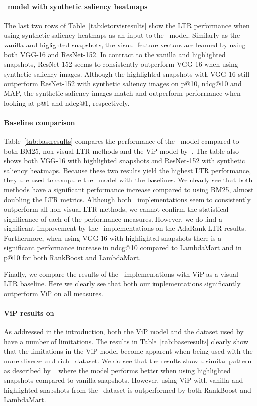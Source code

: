 \paragraph{\modelname~model with synthetic saliency heatmaps}
The last two rows of Table~\ref{tab:letorvisresults} show the \ac{LTR} performance when using synthetic saliency heatmaps as an input to the \modelname~model. Similarly as the vanilla and higlighted snapshots, the visual feature vectors are learned by using both VGG-16 and ResNet-152. In contract to the vanilla and highlighted snapshots, ResNet-152 seems to consistently outperform VGG-16 when using synthetic saliency images. Although the highlighted snapshots with VGG-16 still outperform ResNet-152 with synthetic saliency images on p@10, ndcg@10 and MAP, the synthetic saliency images match and outperform performance when looking at p@1 and ndcg@1, respectively. 

\paragraph{Baseline comparison}
Table~\ref{tab:baseresults} compares the performance of the \modelname~model compared to both BM25, non-visual \ac{LTR} methods and the ViP model by~\citet{fan2017learning}. 
The table also shows both VGG-16 with highlighted snapshots and ResNet-152 with synthetic saliency heatmaps. Because these two results yield the highest \ac{LTR} performance, they are used to compare the \modelname~model with the baselines. 
We clearly see that both methods have a significant performance increase compared to using BM25, almost doubling the \ac{LTR} metrics.
Although both \modelname~implementations seem to consistently outperform all non-visual \ac{LTR} methods, we cannot confirm the statistical significance of each of the performance measures. 
However, we do find a significant improvement by the \modelname~implementations on the AdaRank \ac{LTR} results. Furthermore, when using VGG-16 with highlighted snapshots there is a significant performance increase in ndcg@10 compared to LambdaMart and in p@10 for both RankBoost and LambdaMart.

Finally, we compare the results of the \modelname~implementations with ViP as a visual \ac{LTR} baseline. 
Here we clearly see that both our implementations significantly outperform ViP on all measures. 

\paragraph{ViP results on \datasetname}
As addressed in the introduction, both the ViP model and the dataset used by~\citet{fan2017learning} have a number of limitations. The results in Table~\ref{tab:baseresults} clearly show that the limitations in the ViP model become apparent when being used with the more diverse and rich \datasetname~dataset. We do see that the results show a similar pattern as described by ~\citet{fan2017learning} where the model performs better when using highlighted snapshots compared to vanilla snapshots. However, using ViP with vanilla and highlighted snapshots from the \datasetname~dataset is outperformed by both RankBoost and LambdaMart. 

